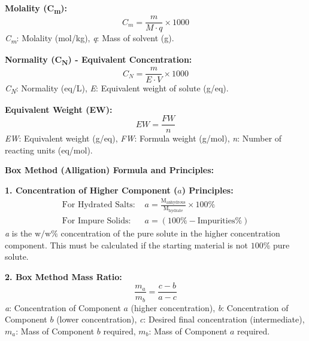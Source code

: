\vspace{5mm}

\textbf{Molality (C\textsubscript{m}):}
\begin{equation}
C_m = \frac{m}{M \cdot q} \times 1000
\end{equation}
\textit{C\textsubscript{m}}: Molality (mol/kg), \textit{q}: Mass of solvent (g).

\vspace{5mm}
\textbf{Normality (C\textsubscript{N}) - Equivalent Concentration:}
\begin{equation}
C_N = \frac{m}{E \cdot V} \times 1000
\end{equation}
\textit{C\textsubscript{N}}: Normality (eq/L), \textit{E}: Equivalent weight of solute (g/eq).

\vspace{5mm}

\textbf{Equivalent Weight (EW):}
\begin{equation}
EW = \frac{FW}{n}
\end{equation}
\textit{EW}: Equivalent weight (g/eq), \textit{FW}: Formula weight (g/mol), \textit{n}: Number of reacting units (eq/mol).
\vspace{5mm}

\vspace{5mm}

\textbf{Box Method (Alligation) Formula and Principles:}

\textbf{1. Concentration of Higher Component ($a$) Principles:}
\begin{align}
\text{For Hydrated Salts: } & a = \frac{\text{M}_{\text{anhydrous}}}{\text{M}_{\text{hydrate}}} \times 100\% \\
\text{For Impure Solids: } & a = (100\% - \text{Impurities}\%)
\end{align}
\textit{a} is the $\text{w/w}\%$ concentration of the pure solute in the higher concentration component. This must be calculated if the starting material is not $100\%$ pure solute.

\vspace{5mm}

\textbf{2. Box Method Mass Ratio:}
\begin{equation}
\frac{m_a}{m_b} = \frac{c - b}{a - c}
\end{equation}
\textit{a}: Concentration of Component $a$ (higher concentration), \textit{b}: Concentration of Component $b$ (lower concentration), \textit{c}: Desired final concentration (intermediate), $m_a$: Mass of Component $b$ required, $m_b$: Mass of Component $a$ required.

